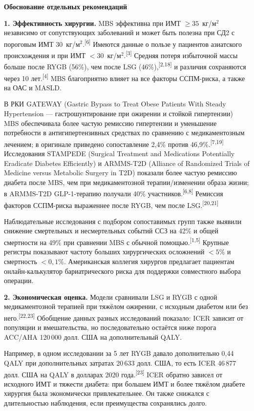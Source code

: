 \documentclass[11pt,a4paper]{article}
\newcommand{\src}[1]{\textsuperscript{[#1]}}
\newcommand{\heading}[1]{\par\medskip\textbf{#1}\par}
\begin{document}
\heading{Обоснование отдельных рекомендаций}
\textbf{1. Эффективность хирургии.} MBS эффективна при ИМТ $\geq35$~кг/м$^2$ независимо от сопутствующих заболеваний и может быть полезна при СД2 с пороговым ИМТ 30~кг/м$^2$.\src{6} Имеются данные о пользе у пациентов азиатского происхождения и при ИМТ $<30$~кг/м$^2$.\src{3} Средняя потеря избыточной массы больше после RYGB (56\%), чем после LSG (46\%),\src{2,18} и различия сохраняются через 10 лет.\src{4} MBS благоприятно влияет на все факторы ССПМ-риска, а также на ОАС и MASLD.

В РКИ GATEWAY (Gastric Bypass to Treat Obese Patients With Steady Hypertension --- гастрошунтирование при ожирении и стойкой гипертензии) MBS обеспечивала более частую ремиссию гипертензии и уменьшение потребности в антигипертензивных средствах по сравнению с медикаментозным лечением; в оригинале приведено сопоставление 2,4\% против 46,9\%.\src{7,19} Исследования STAMPEDE (Surgical Treatment and Medications Potentially Eradicate Diabetes Efficiently) и ARMMS-T2D (Alliance of Randomized Trials of Medicine versus Metabolic Surgery in T2D) показали более частую ремиссию диабета после MBS, чем при медикаментозной терапии/изменении образа жизни; в ARMMS-T2D GLP-1-терапию получали 40\% участников.\src{6,8} Ремиссия факторов ССПМ-риска выраженнее после RYGB, чем после LSG.\src{20,21}

Наблюдательные исследования с подбором сопоставимых групп также выявили снижение смертельных и несмертельных событий ССЗ на 42\% и общей смертности на 49\% при сравнении MBS с обычной помощью.\src{1,5} Крупные регистры показывают частоту больших хирургических осложнений $<5\%$ и смертность $<0{,}1\%$. Американская коллегия хирургов предлагает пациентам онлайн-калькулятор бариатрического риска для поддержки совместного выбора операции.

\textbf{2. Экономическая оценка.} Модели сравнивали LSG и RYGB с одной медикаментозной терапией при тяжёлом ожирении, с исходным диабетом или без него.\src{22,23} Обобщение данных разных исследований показало: ICER зависит от популяции и вмешательства, но последовательно остаётся ниже порога ACC/AHA 120\,000 долл. США на дополнительный QALY.

Например, в одном исследовании за 5 лет RYGB давало дополнительно 0,44 QALY при дополнительных затратах 20\,633 долл. США, то есть ICER 46\,877 долл. США на QALY в долларах 2020 года.\src{23} ICER обратно зависел от исходного ИМТ и тяжести диабета: при большем ИМТ и более тяжёлом диабете хирургия была экономически привлекательнее. Он также снижался с длительностью наблюдения, если преимущества сохранялись долго.
\end{document}
